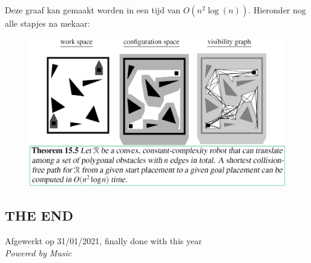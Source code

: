 \documentclass[12pt,a4paper]{article}
\begin{document}
	Deze graaf kan gemaakt worden in een tijd van $O(n^2\log(n))$. Hieronder nog alle stapjes na mekaar: 
	\begin{figure}[H]
		\centering
		\includegraphics[width=0.7\linewidth]{afbeeldingen/Motion-plannine/last-one}
		\label{fig:last-one}
	\end{figure}
	
	\subsection*{THE END}
	Afgewerkt op 31/01/2021, finally done with this year\\
	\textit{Powered by Music} 
	
	
\end{document}
